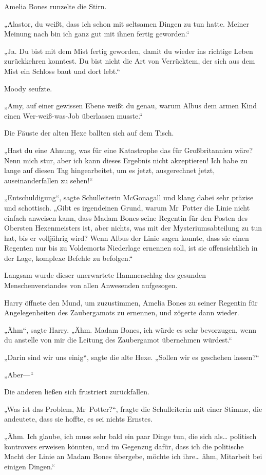 {Amelia Bones runzelte die Stirn.

„Alastor, du weißt, dass ich schon mit seltsamen Dingen zu tun hatte. Meiner Meinung nach bin ich ganz gut mit ihnen fertig geworden.“

„Ja. Du bist mit dem Mist fertig geworden, damit du wieder ins richtige Leben zurückkehren konntest. Du bist nicht die Art von Verrücktem, der sich aus dem Mist ein Schloss baut und dort lebt.“

Moody seufzte.

„Amy, auf einer gewissen Ebene weißt du genau, warum Albus dem armen Kind einen Wer-weiß-was-Job überlassen musste.“

Die Fäuste der alten Hexe ballten sich auf dem Tisch.

„Hast du eine Ahnung, was für eine Katastrophe das für Großbritannien wäre? Nenn mich stur, aber ich kann dieses Ergebnis nicht akzeptieren! Ich habe zu lange auf diesen Tag hingearbeitet, um es jetzt, ausgerechnet jetzt, auseinanderfallen zu sehen!“

„Entschuldigung“, sagte Schulleiterin McGonagall und klang dabei sehr präzise und schottisch. „Gibt es irgendeinen Grund, warum Mr~Potter die Linie nicht einfach anweisen kann, dass Madam Bones seine Regentin für den Posten des Obersten Hexenmeisters ist, aber nichts, was mit der Mysteriumsabteilung zu tun hat, bis er volljährig wird? Wenn Albus der Linie sagen konnte, dass sie einen Regenten nur bis zu Voldemorts Niederlage ernennen soll, ist sie offensichtlich in der Lage, komplexe Befehle zu befolgen.“

Langsam wurde dieser unerwartete Hammerschlag des gesunden Menschenverstandes von allen Anwesenden aufgesogen.

Harry öffnete den Mund, um zuzustimmen, Amelia Bones zu seiner Regentin für Angelegenheiten des Zaubergamots zu ernennen, und zögerte dann wieder.

„Ähm“, sagte Harry. „Ähm. Madam Bones, ich würde es sehr bevorzugen, wenn du anstelle von mir die Leitung des Zaubergamot übernehmen würdest.“

„Darin sind wir uns einig“, sagte die alte Hexe. „Sollen wir es geschehen lassen?“

„Aber—“

Die anderen ließen sich frustriert zurückfallen.

„Was ist das Problem, Mr~Potter?“, fragte die Schulleiterin mit einer Stimme, die andeutete, dass sie hoffte, es sei nichts Ernstes.

„Ähm. Ich glaube, ich muss sehr bald ein paar Dinge tun, die sich als… politisch kontrovers erweisen könnten, und im Gegenzug dafür, dass ich die politische Macht der Linie an Madam Bones übergebe, möchte ich ihre… ähm, Mitarbeit bei einigen Dingen.“

}
